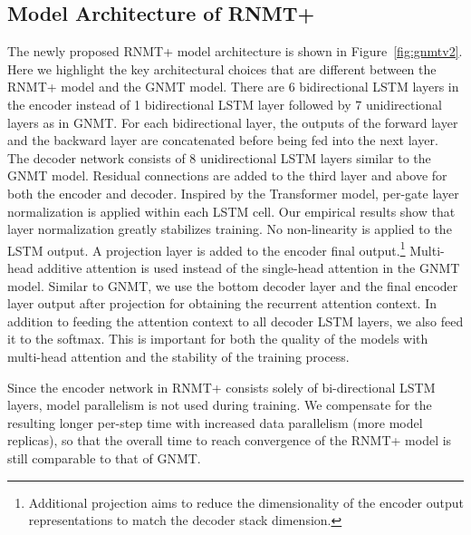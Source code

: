\documentclass[11pt,a4paper]{article}
\begin{document}
\subsection{Model Architecture of RNMT+}
The newly proposed RNMT+ model architecture is shown in Figure~\ref{fig:gnmtv2}.
Here we highlight the key architectural choices that are different between
the RNMT+ model and the GNMT model.
There are 6 bidirectional LSTM layers in
the encoder instead of 1 bidirectional LSTM layer followed by 7 unidirectional
layers as in GNMT. For each
bidirectional layer, the outputs of the forward layer and the backward layer
are concatenated before being fed into the next layer.
The decoder network consists of 8 unidirectional LSTM layers similar to the
GNMT model.
Residual connections are
added to the third layer and above for both the encoder and decoder. Inspired by
the Transformer model, per-gate
layer normalization \cite{DBLP:journals/corr/BaKH16} is applied within each LSTM cell. Our empirical results
show that layer normalization greatly stabilizes training. No non-linearity is
applied to the LSTM output.  A projection layer is added to the encoder final
output.\footnote{Additional projection aims to reduce the dimensionality of
the encoder output representations to match the decoder stack dimension.}
Multi-head additive attention is used instead of the single-head
attention in the GNMT model. Similar to GNMT, we use the bottom decoder layer
and the final encoder layer output after projection for obtaining the recurrent
attention context. In addition to feeding the attention context to all decoder
LSTM layers, we also feed it to the softmax.
This is important for both the
quality of the models with multi-head attention and the stability of the
training process.

Since the encoder network in RNMT+ consists solely of bi-directional LSTM
layers, model parallelism is not used during training. We compensate for
the resulting longer per-step time with increased data parallelism
(more model replicas), so that the overall time to reach
convergence of the RNMT+ model is still comparable to that of GNMT.
\end{document}
